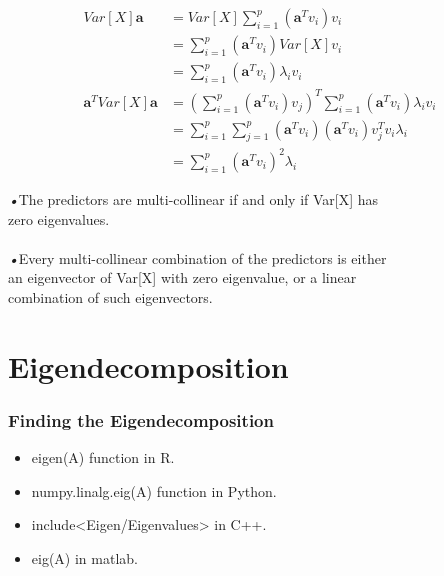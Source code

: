 \documentclass{beamer}
\begin{document}
\begin{frame}
\begin{equation*}
\begin{aligned}
Var\left[ X\right] \textbf{a} &= Var\left[ X\right]\sum_{i=1}^{p}\left( \textbf{a}^{T} v_i\right) v_i
\\&=\sum_{i=1}^{p}\left( \textbf{a}^{T} v_i\right)Var\left[ X\right]v_i
\\&=\sum_{i=1}^{p}\left( \textbf{a}^{T} v_i\right)\lambda_i v_i
\\\textbf{a}^{T} Var\left[ X\right]\textbf{a}  
&= \left( \sum_{i=1}^{p}\left( \textbf{a}^{T} v_i\right)v_j\right) ^{T} \sum_{i=1}^{p}\left( \textbf{a}^{T} v_i\right)\lambda_i v_i
\\&=\sum_{i=1}^{p}\sum_{j=1}^{p}\left( \textbf{a}^{T} v_i\right)\left( \textbf{a}^{T} v_i\right)v_j^{T} v_i\lambda_i
\\&=\sum_{i=1}^{p}\left( \textbf{a}^{T} v_i\right)^2\lambda_i
\end{aligned}
\end{equation*}
\end{frame}
\begin{frame}
\emph{•}The predictors are multi-collinear if and only if Var[X] has  
\\\quad zero eigenvalues.
\\\mbox{}
\\\emph{•}Every multi-collinear combination of the predictors is either 
\\\quad an  eigenvector of Var[X] with zero eigenvalue, or a linear 
\\\quad combination of such eigenvectors.
\end{frame}
	
\section{Eigendecomposition}

\begin{frame}
\frametitle{Finding the Eigendecomposition}
\begin{itemize}
	\item eigen(A) function in R.
	\item numpy.linalg.eig(A) function in Python.
	\item include<Eigen/Eigenvalues> in C++.
	\item eig(A) in matlab.
\end{itemize}
\end{frame}
\end{document}
